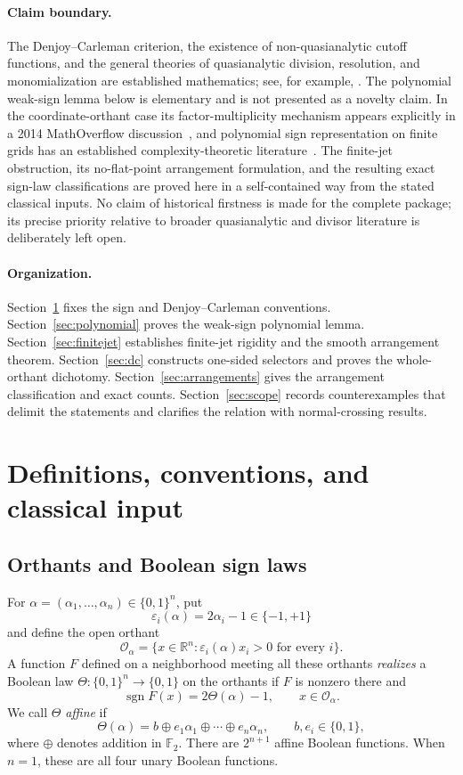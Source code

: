 \documentclass[11pt]{article}
\theoremstyle{definition}
\theoremstyle{remark}
\newcommand{\R}{\mathbb{R}}
\newcommand{\Ftwo}{\mathbb{F}_2}
\newcommand{\bits}{\{0,1\}}
\newcommand{\sign}{\operatorname{sgn}}
\newcommand{\eps}{\varepsilon}
\begin{document}
\paragraph{Claim boundary.}
The Denjoy--Carleman criterion, the existence of non-quasianalytic cutoff functions, and the general theories of quasianalytic division, resolution, and monomialization are established mathematics; see, for example, \cite{Rainer2022,Thilliez2008,BelottoBierstoneChow2018,BierstoneMilman2004,BelottoBierstone2023}. The polynomial weak-sign lemma below is elementary and is not presented as a novelty claim. In the coordinate-orthant case its factor-multiplicity mechanism appears explicitly in a 2014 MathOverflow discussion~\cite{MathOverflow2014}, and polynomial sign representation on finite grids has an established complexity-theoretic literature~\cite{BasuEtAl2008}. The finite-jet obstruction, its no-flat-point arrangement formulation, and the resulting exact sign-law classifications are proved here in a self-contained way from the stated classical inputs. No claim of historical firstness is made for the complete package; its precise priority relative to broader quasianalytic and divisor literature is deliberately left open.

\paragraph{Organization.}
Section~\ref{sec:setup} fixes the sign and Denjoy--Carleman conventions. Section~\ref{sec:polynomial} proves the weak-sign polynomial lemma. Section~\ref{sec:finitejet} establishes finite-jet rigidity and the smooth arrangement theorem. Section~\ref{sec:dc} constructs one-sided selectors and proves the whole-orthant dichotomy. Section~\ref{sec:arrangements} gives the arrangement classification and exact counts. Section~\ref{sec:scope} records counterexamples that delimit the statements and clarifies the relation with normal-crossing results.

\section{Definitions, conventions, and classical input}\label{sec:setup}

\subsection{Orthants and Boolean sign laws}

For $\alpha=(\alpha_1,\dots,\alpha_n)\in\bits^n$, put
\[
 \eps_i(\alpha)=2\alpha_i-1\in\{-1,+1\}
\]
and define the open orthant
\[
 \mathcal{O}_\alpha
 =\{x\in\R^n:\eps_i(\alpha)x_i>0\text{ for every }i\}.
\]
A function $F$ defined on a neighborhood meeting all these orthants \emph{realizes} a Boolean law $\Theta:\bits^n\to\bits$ on the orthants if $F$ is nonzero there and
\[
 \sign F(x)=2\Theta(\alpha)-1,
 \qquad x\in\mathcal{O}_\alpha.
\]
We call $\Theta$ \emph{affine} if
\[
 \Theta(\alpha)=b\oplus e_1\alpha_1\oplus\cdots\oplus e_n\alpha_n,
 \qquad b,e_i\in\bits,
\]
where $\oplus$ denotes addition in $\Ftwo$. There are $2^{n+1}$ affine Boolean functions. When $n=1$, these are all four unary Boolean functions.
\end{document}
